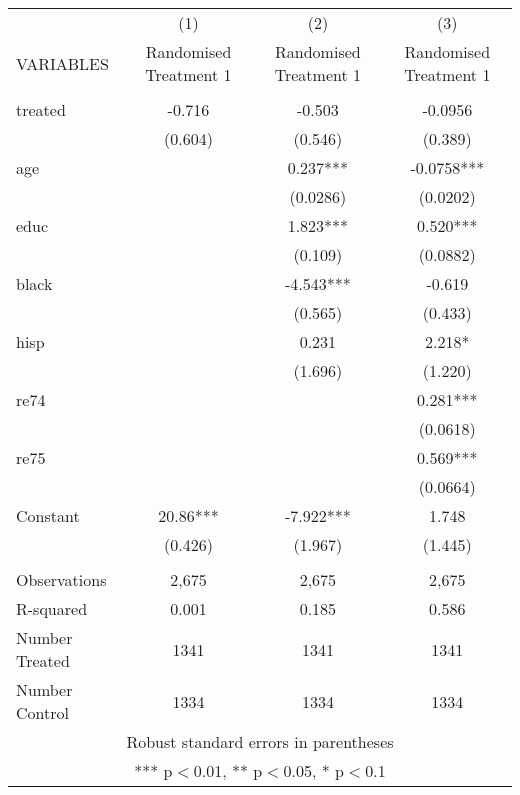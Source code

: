 \documentclass[]{article}
\begin{document}
\begin{tabular}{lccc} \hline
 & (1) & (2) & (3) \\
VARIABLES & Randomised Treatment 1 & Randomised Treatment 1 & Randomised Treatment 1 \\ \hline
 &  &  &  \\
treated & -0.716 & -0.503 & -0.0956 \\
 & (0.604) & (0.546) & (0.389) \\
age &  & 0.237*** & -0.0758*** \\
 &  & (0.0286) & (0.0202) \\
educ &  & 1.823*** & 0.520*** \\
 &  & (0.109) & (0.0882) \\
black &  & -4.543*** & -0.619 \\
 &  & (0.565) & (0.433) \\
hisp &  & 0.231 & 2.218* \\
 &  & (1.696) & (1.220) \\
re74 &  &  & 0.281*** \\
 &  &  & (0.0618) \\
re75 &  &  & 0.569*** \\
 &  &  & (0.0664) \\
Constant & 20.86*** & -7.922*** & 1.748 \\
 & (0.426) & (1.967) & (1.445) \\
 &  &  &  \\
Observations & 2,675 & 2,675 & 2,675 \\
R-squared & 0.001 & 0.185 & 0.586 \\
Number Treated & 1341 & 1341 & 1341 \\
 Number Control & 1334 & 1334 & 1334 \\ \hline
\multicolumn{4}{c}{ Robust standard errors in parentheses} \\
\multicolumn{4}{c}{ *** p$<$0.01, ** p$<$0.05, * p$<$0.1} \\
\end{tabular}
\end{document}
